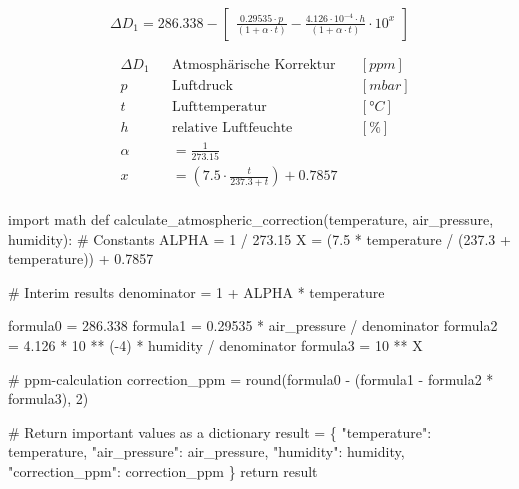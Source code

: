 \documentclass[
  11pt,
  a4paper,
  oneside, openany  ,captions=tableheading
]{scrbook}
\newenvironment{Shaded}{\begin{snugshade}}{\end{snugshade}}
\newcommand{\BuiltInTok}[1]{\textcolor[rgb]{0.00,0.23,0.31}{#1}}
\newcommand{\CommentTok}[1]{\textcolor[rgb]{0.37,0.37,0.37}{#1}}
\newcommand{\ControlFlowTok}[1]{\textcolor[rgb]{0.00,0.23,0.31}{#1}}
\newcommand{\DecValTok}[1]{\textcolor[rgb]{0.68,0.00,0.00}{#1}}
\newcommand{\FloatTok}[1]{\textcolor[rgb]{0.68,0.00,0.00}{#1}}
\newcommand{\ImportTok}[1]{\textcolor[rgb]{0.00,0.46,0.62}{#1}}
\newcommand{\KeywordTok}[1]{\textcolor[rgb]{0.00,0.23,0.31}{#1}}
\newcommand{\NormalTok}[1]{\textcolor[rgb]{0.00,0.23,0.31}{#1}}
\newcommand{\OperatorTok}[1]{\textcolor[rgb]{0.37,0.37,0.37}{#1}}
\newcommand{\StringTok}[1]{\textcolor[rgb]{0.13,0.47,0.30}{#1}}
\theoremstyle{remark}
\begin{document}
\[\Delta D_1 = 286.338 - \begin{bmatrix}\frac{0.29535 \cdot p}{(1+\alpha \cdot t)}-\frac{4.126 \cdot 10^{-4} \cdot h}{(1+\alpha \cdot t)} \cdot 10^x\end{bmatrix}\]

\[\begin{aligned}
& \Delta D_1 && \text{Atmosphärische Korrektur} && [ppm]\\
& p && \text{Luftdruck} && [mbar]\\
& t && \text{Lufttemperatur} && [°C]\\
& h && \text{relative Luftfeuchte} && [\%]\\
& \alpha && = \frac{1}{273.15} \\
& x && = (7.5 \cdot \frac{t}{237.3 +t}) + 0.7857 \\
\end{aligned}
\]

\begin{Shaded}
\begin{Highlighting}[]
\ImportTok{import}\NormalTok{ math}
\KeywordTok{def}\NormalTok{ calculate\_atmospheric\_correction(temperature, air\_pressure, humidity):}
    \CommentTok{\# Constants}
\NormalTok{    ALPHA }\OperatorTok{=} \DecValTok{1} \OperatorTok{/} \FloatTok{273.15}
\NormalTok{    X }\OperatorTok{=}\NormalTok{ (}\FloatTok{7.5} \OperatorTok{*}\NormalTok{ temperature }\OperatorTok{/}\NormalTok{ (}\FloatTok{237.3} \OperatorTok{+}\NormalTok{ temperature)) }\OperatorTok{+} \FloatTok{0.7857}

    \CommentTok{\# Interim results}
\NormalTok{    denominator }\OperatorTok{=} \DecValTok{1} \OperatorTok{+}\NormalTok{ ALPHA }\OperatorTok{*}\NormalTok{ temperature}

\NormalTok{    formula0 }\OperatorTok{=} \FloatTok{286.338}
\NormalTok{    formula1 }\OperatorTok{=} \FloatTok{0.29535} \OperatorTok{*}\NormalTok{ air\_pressure }\OperatorTok{/}\NormalTok{ denominator}
\NormalTok{    formula2 }\OperatorTok{=} \FloatTok{4.126} \OperatorTok{*} \DecValTok{10} \OperatorTok{**}\NormalTok{ (}\OperatorTok{{-}}\DecValTok{4}\NormalTok{) }\OperatorTok{*}\NormalTok{ humidity }\OperatorTok{/}\NormalTok{ denominator}
\NormalTok{    formula3 }\OperatorTok{=} \DecValTok{10} \OperatorTok{**}\NormalTok{ X}

    \CommentTok{\# ppm{-}calculation}
\NormalTok{    correction\_ppm }\OperatorTok{=} \BuiltInTok{round}\NormalTok{(formula0 }\OperatorTok{{-}}\NormalTok{ (formula1 }\OperatorTok{{-}}\NormalTok{ formula2 }\OperatorTok{*}\NormalTok{ formula3), }\DecValTok{2}\NormalTok{)}

    \CommentTok{\# Return important values as a dictionary}
\NormalTok{    result }\OperatorTok{=}\NormalTok{ \{}
        \StringTok{"temperature"}\NormalTok{: temperature,}
        \StringTok{"air\_pressure"}\NormalTok{: air\_pressure,}
        \StringTok{"humidity"}\NormalTok{: humidity,}
        \StringTok{"correction\_ppm"}\NormalTok{: correction\_ppm}
\NormalTok{    \}}
    \ControlFlowTok{return}\NormalTok{ result}
\end{Highlighting}
\end{Shaded}
\end{document}

